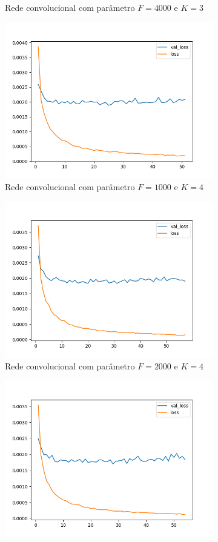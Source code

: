 \begin{figure}[H]
\begin{subfigure}{.5\textwidth}
  \caption{Rede convolucional com parâmetro $F = 4000$ e $K = 3$}
  \label{fig:cnn-4000-k-3}
\end{subfigure}
\begin{subfigure}{.5\textwidth}
  \centering
  \includegraphics[width=.8\linewidth]{figuras/ape-ajustes-hiper-parametros/cnn-1000-k-4.png}
  \caption{Rede convolucional com parâmetro $F = 1000$ e $K = 4$}
  \label{fig:cnn-1000-k-4}
\end{subfigure}
\begin{subfigure}{.5\textwidth}
  \centering
  \includegraphics[width=.8\linewidth]{figuras/ape-ajustes-hiper-parametros/cnn-2000-k-4.png}
  \caption{Rede convolucional com parâmetro $F = 2000$ e $K = 4$}
  \label{fig:cnn-2000-k-4}
\end{subfigure}
\begin{subfigure}{.5\textwidth}
  \centering
  \includegraphics[width=.8\linewidth]{figuras/ape-ajustes-hiper-parametros/cnn-4000-k-4.png}

\end{subfigure}
\end{figure}
